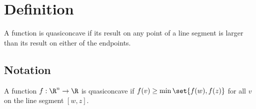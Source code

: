 

\section*{Definition}

A function is quasiconcave if its result on any point of a line segment is larger than its result on either of the endpoints.

\subsection*{Notation}

A function $f: \R ^n \to \R $ is quasiconcave if $f(v) \geq \min\set{f(w), f(z)}$ for all $v$ on the line segment $[w, z]$.

\blankpage